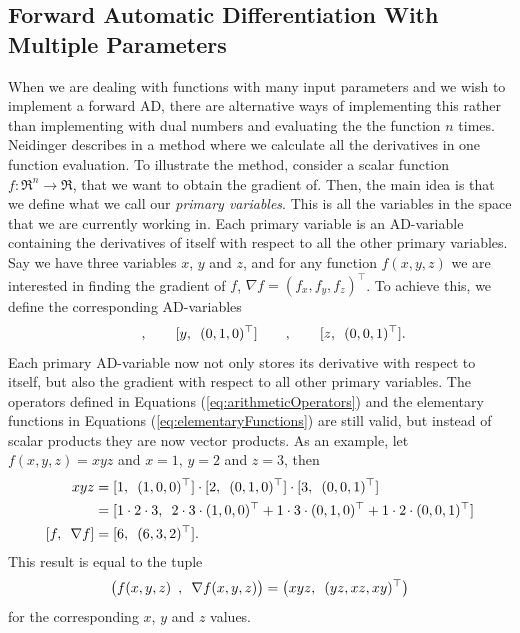 \subsection{Forward Automatic Differentiation With Multiple Parameters}
When we are dealing with functions with many input parameters and we wish to implement a forward AD, there are alternative ways of implementing this rather than implementing with dual numbers and evaluating the the function $n$ times. Neidinger describes in \emph{\citet{doi:10.1137/080743627}} a method where we calculate all the derivatives in one function evaluation. To illustrate the method, consider a scalar function $f: \Re^n \rightarrow \Re$, that we want to obtain the gradient of. Then, the main idea is that we define what we call our \textit{primary variables}. This is all the variables in the space that we are currently working in. Each primary variable is an AD-variable containing the derivatives of itself with respect to all the other primary variables. Say we have three variables $x$, $y$ and $z$, and for any function $f(x,y,z)$ we are interested in finding the gradient of $f$, $\nabla f=(f_x, f_y, f_z)^\top$. To achieve this, we define the corresponding AD-variables
\begin{equation*}
    [\adpair{x}{(1,0,0)^\top}]\hspace{2em},\hspace{2em}
    [\adpair{y}{(0,1,0)^\top}]\hspace{2em},\hspace{2em}
    [\adpair{z}{(0,0,1)^\top}].
\end{equation*}
Each primary AD-variable now not only stores its derivative with respect to itself, but also the gradient with respect to all other primary variables. The operators defined in Equations (\ref{eq:arithmeticOperators}) and the elementary functions in Equations (\ref{eq:elementaryFunctions}) are still valid, but instead of scalar products they are now vector products. As an example, let $f(x,y,z) = xyz$ and $x = 1$, $y = 2$ and $z = 3$, then
\begin{align*}
    xyz &= [\adpair{1}{(1,0,0)^\top}]\cdot [\adpair{2}{(0,1,0)^\top}]\cdot
    [\adpair{3}{(0,0,1)^\top}] \\
    &=[\adpair{1\cdot 2\cdot 3}{2\cdot3\cdot(1,0,0)^\top + 1\cdot3\cdot(0,1,0)^\top + 1\cdot2\cdot(0,0,1)^\top}] \\
    [\adpair{f}{\nabla f}] &= [\adpair{6}{(6,3,2)^\top}].
\end{align*}
This result is equal to the tuple
\begin{equation*}
    \big(f(x,y,z) \hspace{0.5em},\hspace{0.5em} \nabla f(x,y,z)\big) = \big(xyz ,\hspace{0.5em} (yz,xz,xy)^\top\big)
\end{equation*}
for the corresponding $x$, $y$ and $z$ values. 

